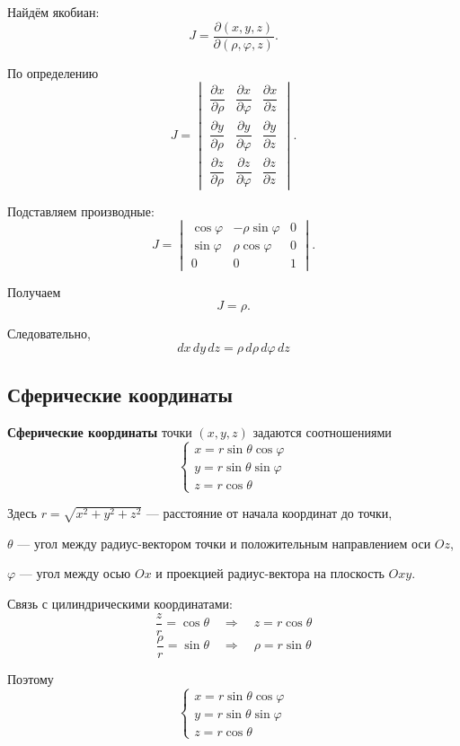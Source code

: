 \documentclass[12pt,a4paper]{article}
\begin{document}
Найдём якобиан:
\[
J=
\frac{\partial(x,y,z)}
{\partial(\rho,\varphi,z)}.
\]

По определению
\[
J=
\begin{vmatrix}
\dfrac{\partial x}{\partial\rho}&
\dfrac{\partial x}{\partial\varphi}&
\dfrac{\partial x}{\partial z}\\[6pt]
\dfrac{\partial y}{\partial\rho}&
\dfrac{\partial y}{\partial\varphi}&
\dfrac{\partial y}{\partial z}\\[6pt]
\dfrac{\partial z}{\partial\rho}&
\dfrac{\partial z}{\partial\varphi}&
\dfrac{\partial z}{\partial z}
\end{vmatrix}.
\]

Подставляем производные:
\[
J=
\begin{vmatrix}
\cos\varphi&-\rho\sin\varphi&0\\
\sin\varphi&\rho\cos\varphi&0\\
0&0&1
\end{vmatrix}.
\]

Получаем
\[
J=\rho.
\]

Следовательно,
\[
dx\,dy\,dz=\rho\,d\rho\,d\varphi\,dz
\]

\subsection{Сферические координаты}

\begin{definition}
\textbf{Сферические координаты} точки $(x,y,z)$ задаются соотношениями
\[
\begin{cases}
x=r\sin\theta\cos\varphi\\
y=r\sin\theta\sin\varphi\\
z=r\cos\theta
\end{cases}
\]

Здесь $r=\sqrt{x^2+y^2+z^2}$ — расстояние от начала координат до точки,

$\theta$ — угол между радиус-вектором точки и положительным направлением оси $Oz$,

$\varphi$ — угол между осью $Ox$ и проекцией радиус-вектора на плоскость $Oxy$.
\end{definition}

Связь с цилиндрическими координатами:
\[
\frac{z}{r}=\cos\theta
\quad\Longrightarrow\quad
z=r\cos\theta
\]
\[
\frac{\rho}{r}=\sin\theta
\quad\Longrightarrow\quad
\rho=r\sin\theta
\]

Поэтому
\[
\begin{cases}
x=r\sin\theta\cos\varphi\\
y=r\sin\theta\sin\varphi\\
z=r\cos\theta
\end{cases}
\]
\end{document}
